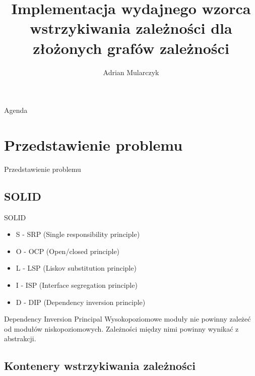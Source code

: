 \documentclass{beamer}
\title[]
{Implementacja wydajnego wzorca wstrzykiwania zależności dla złożonych grafów zależności}
\author[Adrian Mularczyk]
{Adrian Mularczyk}
\institute[Uniwersytet Wrocławski]
{
Uniwersytet Wrocławski\\
Wydział Matematyki i Informatyki\\
Kierunek: Informatyka
}
\date{}
\begin{document}
\begin{frame}
  \titlepage
\end{frame}

\begin{frame}{Agenda}
  \tableofcontents
\end{frame}


\section{Przedstawienie problemu}

\begin{frame}{}
\begin{center}
\huge{Przedstawienie problemu}
\end{center}
\end{frame}

\subsection*{SOLID}

\begin{frame}{SOLID}
\begin{itemize}
	\item S - SRP (Single responsibility principle)
	\item O - OCP (Open/closed principle)
	\item L - LSP (Liskov substitution principle)
	\item I - ISP (Interface segregation principle)
	\item D - DIP (Dependency inversion principle)
\end{itemize}
\end{frame}

\begin{frame}{Dependency Inversion Principal}
Wysokopoziomowe moduły nie powinny zależeć od modułów niskopoziomowych. Zależności między nimi powinny wynikać z abstrakcji.
\end{frame}


\subsection*{Kontenery wstrzykiwania zależności}
\end{document}
